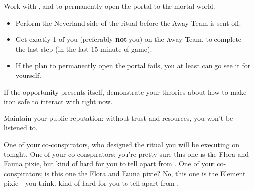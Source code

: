 \documentclass[char]{PP}
\begin{document}
\begin{itemz}
	\item Work with \cSLibrarian{}, \cFHeart{} and \cESweet{} to permanently open the portal to the mortal world.
	\begin{itemize}
		\item Perform the Neverland side of the ritual before the Away Team is sent off.
		\item Get exactly 1 of you (preferably \textbf{not} you) on the Away Team, to complete the last step (in the last 15 minute of game).
		\item If the plan to permanently open the portal fails, you at least can go see it for yourself.
	\end{itemize}
	\item If the opportunity presents itself, demonstrate your theories about how to make iron safe to interact with right now.
	\item Maintain your public reputation: without trust and resources, you won't be listened to.
	\item
\end{itemz}

\begin{itemz}[Notes]
	\item 
\end{itemz}

\begin{contacts}
	\contact{\cSLibrarian{}} One of your co-conspirators, who designed the ritual you will be executing on tonight.
	\contact{\cFHeart{}} One of your co-conspirators; you’re pretty sure this one is the Flora and Fauna pixie, but \cFHeart{\they} \cFHeart{\are} kind of hard for you to tell apart from \cESweet{}.
	\contact{\cESweet{}} One of your co-conspirators; is this one the Flora and Fauna pixie? No, this one is the Element pixie - you think. \cESweet{\They} \cESweet{\are} kind of hard for you to tell apart from \cFHeart{}.
\end{contacts}
\end{document}
